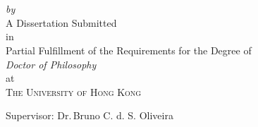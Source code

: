 \begin{titlepage}
  \vspace*{5cm}
  \makeatletter
  \begin{center}
    \begin{Huge}
      \@title
    \end{Huge}\\[0.1cm]
    \begin{Large}
      \@subtitle
    \end{Large}\\
    \vskip 0.25cm
    \emph{by}\\
    \vskip 0.25cm
    \@author
    \vfill
    A Dissertation Submitted \\
    in \\
    Partial Fulfillment of the Requirements for the Degree of\\
    \emph{Doctor of Philosophy}\\
    at\\
    \textsc{The University of Hong Kong}
  \end{center}
  \vfill
  \begin{singlespace*}
    Supervisor:            Dr.\,Bruno C. d. S. Oliveira
  \end{singlespace*}
\end{titlepage}

\newpage
\null
\thispagestyle{empty}
\newpage
